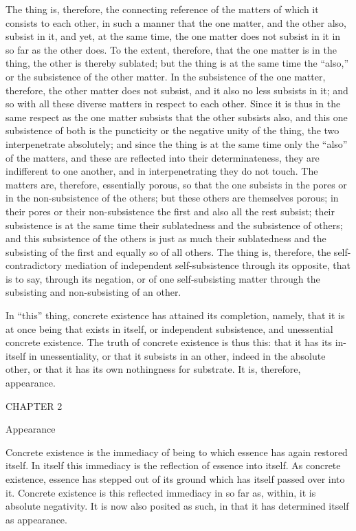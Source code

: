 The thing is, therefore, the connecting reference of
the matters of which it consists to each other,
in such a manner that the one matter,
and the other also, subsist in it,
and yet, at the same time,
the one matter does not subsist
in it in so far as the other does.
To the extent, therefore, that
the one matter is in the thing,
the other is thereby sublated;
but the thing is at the same time
the “also,” or the subsistence of the other matter.
In the subsistence of the one matter, therefore,
the other matter does not subsist,
and it also no less subsists in it;
and so with all these diverse matters
in respect to each other.
Since it is thus in the same respect
as the one matter subsists
that the other subsists also,
and this one subsistence of both is
the puncticity or the negative unity of the thing,
the two interpenetrate absolutely;
and since the thing is at the same time
only the “also” of the matters,
and these are reflected into their determinateness,
they are indifferent to one another,
and in interpenetrating they do not touch.
The matters are, therefore, essentially porous,
so that the one subsists in the pores
or in the non-subsistence of the others;
but these others are themselves porous;
in their pores or their non-subsistence
the first and also all the rest subsist;
their subsistence is at the same time
their sublatedness and the subsistence of others;
and this subsistence of the others is
just as much their sublatedness
and the subsisting of the first
and equally so of all others.
The thing is, therefore,
the self-contradictory mediation of
independent self-subsistence through its opposite,
that is to say, through its negation,
or of one self-subsisting matter
through the subsisting and non-subsisting of an other.

In “this” thing, concrete existence has attained its completion,
namely, that it is at once being that exists in itself,
or independent subsistence, and unessential concrete existence.
The truth of concrete existence is thus this:
that it has its in-itself in unessentiality,
or that it subsists in an other,
indeed in the absolute other,
or that it has its own nothingness for substrate.
It is, therefore, appearance.

CHAPTER 2

Appearance

Concrete existence is the immediacy of being
to which essence has again restored itself.
In itself this immediacy is the reflection of essence into itself.
As concrete existence, essence has stepped out of its ground
which has itself passed over into it.
Concrete existence is this reflected immediacy
in so far as, within, it is absolute negativity.
It is now also posited as such,
in that it has determined itself as appearance.

